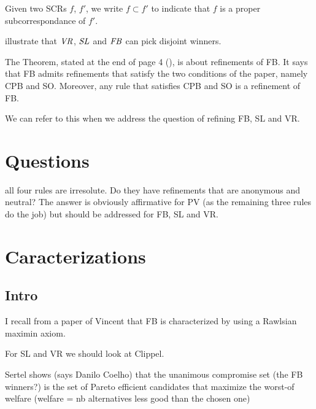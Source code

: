 \documentclass[version=3.21, pagesize, twoside=off, bibliography=totoc, DIV=calc, fontsize=12pt, a4paper]{scrartcl}
\begin{document}
Given two SCRs $f$, $f'$, we write $f \subset f'$ to indicate that $f$ is a proper subcorrespondance of $f'$.

 illustrate that $\mathit{VR}$, $\mathit{SL}$ and $\mathit{FB}$ can pick disjoint winners.

The Theorem, stated at the end of page 4 (), is about refinements of FB. It says that FB admits refinements that satisfy the two conditions of the paper, namely CPB and SO. Moreover, any rule that satisfies CPB and SO is a refinement of FB.

We can refer to this when we address the question of refining FB, SL and VR.

\section{Questions}
all four rules are irresolute. Do they have refinements that are anonymous and neutral? The answer is obviously affirmative for PV (as the remaining three rules do the job) but should be addressed for FB, SL and VR. 

\section{Caracterizations}
\subsection{Intro}
I recall from a paper of Vincent that FB is characterized by using a Rawlsian maximin axiom. 

For SL and VR we should look at Clippel. 

Sertel shows (says Danilo Coelho) that the unanimous compromise set (the FB winners?) is the set of Pareto efficient candidates that maximize the worst-of welfare (welfare = nb alternatives less good than the chosen one)
\end{document}
